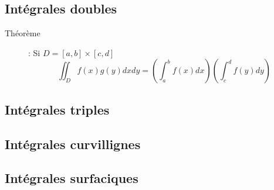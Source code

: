 \subsection{Intégrales doubles}
\begin{description}
\item[Théorème] : Si $D=[a,b]\times[c,d]$
    \[
        \iint_Df(x)g(y)dxdy=
        \left(\int_a^bf(x)dx\right)
        \left(\int_c^df(y)dy\right)
    \]
\end{description}
\subsection{Intégrales triples}

\subsection{Intégrales curvillignes}

\subsection{Intégrales surfaciques}
